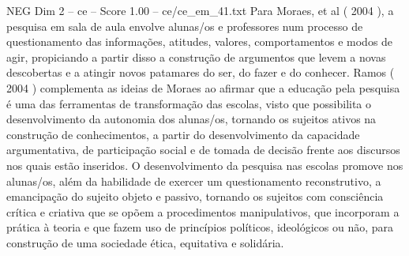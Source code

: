 \begin{textsample}{NEG Dim 2 – ce – Score 1.00 – ce/ce\_em\_41.txt}
Para Moraes, et al ( 2004 ), a pesquisa em sala de aula envolve alunas/os e professores num processo de questionamento das informações, atitudes, valores, comportamentos e modos de agir, propiciando a partir disso a construção de argumentos que levem a novas descobertas e a atingir novos patamares do ser, do fazer e do conhecer.
Ramos ( 2004 ) complementa as ideias de Moraes ao afirmar que a educação pela pesquisa é uma das ferramentas de transformação das escolas, visto que possibilita o desenvolvimento da autonomia dos alunas/os, tornando os sujeitos ativos na construção de conhecimentos, a partir do desenvolvimento da capacidade argumentativa, de participação social e de tomada de decisão frente aos discursos nos quais estão inseridos.
O desenvolvimento da pesquisa nas escolas promove nos alunas/os, além da habilidade de exercer um questionamento reconstrutivo, a emancipação do sujeito objeto e passivo, tornando os sujeitos com consciência crítica e criativa que se opõem a procedimentos manipulativos, que incorporam a prática à teoria e que fazem uso de princípios políticos, ideológicos ou não, para construção de uma sociedade ética, equitativa e solidária.

\end{textsample}
